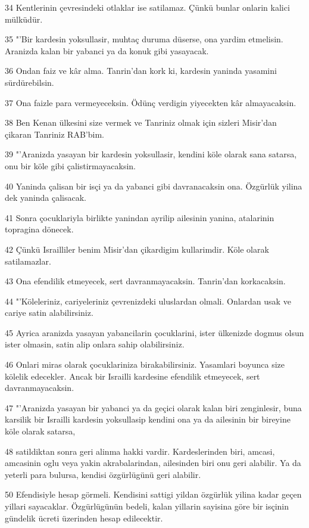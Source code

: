 \par 34 Kentlerinin çevresindeki otlaklar ise satilamaz. Çünkü bunlar onlarin kalici mülküdür.
\par 35 "'Bir kardesin yoksullasir, muhtaç duruma düserse, ona yardim etmelisin. Aranizda kalan bir yabanci ya da konuk gibi yasayacak.
\par 36 Ondan faiz ve kâr alma. Tanrin'dan kork ki, kardesin yaninda yasamini sürdürebilsin.
\par 37 Ona faizle para vermeyeceksin. Ödünç verdigin yiyecekten kâr almayacaksin.
\par 38 Ben Kenan ülkesini size vermek ve Tanriniz olmak için sizleri Misir'dan çikaran Tanriniz RAB'bim.
\par 39 "'Aranizda yasayan bir kardesin yoksullasir, kendini köle olarak sana satarsa, onu bir köle gibi çalistirmayacaksin.
\par 40 Yaninda çalisan bir isçi ya da yabanci gibi davranacaksin ona. Özgürlük yilina dek yaninda çalisacak.
\par 41 Sonra çocuklariyla birlikte yanindan ayrilip ailesinin yanina, atalarinin topragina dönecek.
\par 42 Çünkü Israilliler benim Misir'dan çikardigim kullarimdir. Köle olarak satilamazlar.
\par 43 Ona efendilik etmeyecek, sert davranmayacaksin. Tanrin'dan korkacaksin.
\par 44 "'Köleleriniz, cariyeleriniz çevrenizdeki uluslardan olmali. Onlardan usak ve cariye satin alabilirsiniz.
\par 45 Ayrica aranizda yasayan yabancilarin çocuklarini, ister ülkenizde dogmus olsun ister olmasin, satin alip onlara sahip olabilirsiniz.
\par 46 Onlari miras olarak çocuklariniza birakabilirsiniz. Yasamlari boyunca size kölelik edecekler. Ancak bir Israilli kardesine efendilik etmeyecek, sert davranmayacaksin.
\par 47 "'Aranizda yasayan bir yabanci ya da geçici olarak kalan biri zenginlesir, buna karsilik bir Israilli kardesin yoksullasip kendini ona ya da ailesinin bir bireyine köle olarak satarsa,
\par 48 satildiktan sonra geri alinma hakki vardir. Kardeslerinden biri, amcasi, amcasinin oglu veya yakin akrabalarindan, ailesinden biri onu geri alabilir. Ya da yeterli para bulursa, kendisi özgürlügünü geri alabilir.
\par 50 Efendisiyle hesap görmeli. Kendisini sattigi yildan özgürlük yilina kadar geçen yillari sayacaklar. Özgürlügünün bedeli, kalan yillarin sayisina göre bir isçinin gündelik ücreti üzerinden hesap edilecektir.
